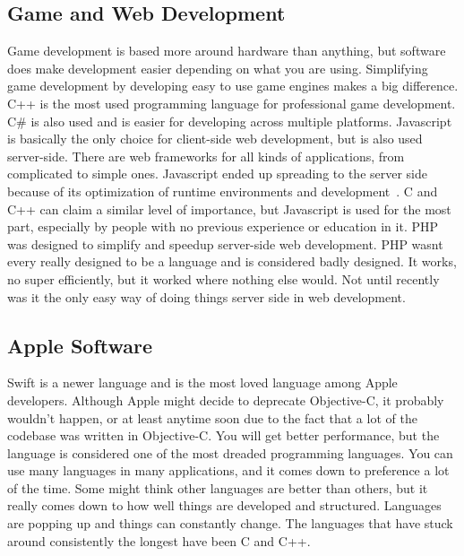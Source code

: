 \documentclass[letterpaper, 10 pt, conference]{IEEEtran}
\begin{document}
\subsection{Game and Web Development}
\indent Game development is based more around hardware than anything, but software does make development easier depending on what you are using. Simplifying game development by developing easy to use game engines makes a big difference. C++ is the most used programming language for professional game development. C\# is also used and is easier for developing across multiple platforms.  Javascript is basically the only choice for client-side web development, but is also used server-side. There are web frameworks for all kinds of applications, from complicated to simple ones. Javascript ended up spreading to the server side because of its optimization of runtime environments and development~\cite{TheBest}. C and C++ can claim a similar level of importance, but Javascript is used for the most part, especially by people with no previous experience or education in it. PHP was designed to simplify and speedup server-side web development. PHP wasnt every really designed to be a language and is considered badly designed. It works, no super efficiently, but it worked where nothing else would. Not until recently was it the only easy way of doing things server side in web development.
\newline
\subsection{Apple Software}
\indent Swift is a newer language and is the most loved language among Apple developers. Although Apple might decide to deprecate  Objective-C, it probably wouldn't happen, or at least anytime soon due to the fact that a lot of the codebase was written in Objective-C. You will get better performance, but the language is considered one of the most dreaded programming languages.
\newline
\indent You can use many languages in many applications, and it comes down to preference a lot of the time. Some might think other languages are better than others, but it really comes down to how well things are developed and structured. Languages are popping up and things can constantly change. The languages that have stuck around consistently the longest have been C and C++.\newline
\end{document}
